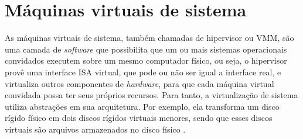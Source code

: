 
\section{Máquinas virtuais de sistema}
\label{section:virtsistema}

As máquinas virtuais de sistema, também chamadas de hipervisor ou \ac{VMM}, são uma camada de \textit{software} que possibilita
que um ou mais sistemas operacionais convidados executem sobre um mesmo computador físico, ou seja, o hipervisor provê uma interface
\ac{ISA} virtual, que pode ou não ser igual a interface real, e virtualiza outros componentes de \textit{hardware}, para que cada máquina
virtual convidada possa ter seus próprios recursos. Para tanto, a virtualização de sistema utiliza abstrações em sua arquitetura. 
Por exemplo, ela transforma um disco rígido físico em dois discos rígidos virtuais menores, sendo que esses discos virtuais são arquivos 
armazenados no disco físico \cite{smithenair2005}. 

